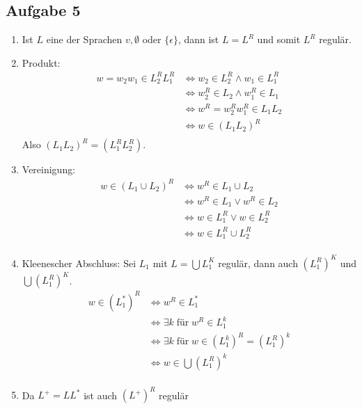 \subsection*{Aufgabe 5}
\begin{enumerate}
  \item Ist $L$ eine der Sprachen ${v}, \emptyset$ oder $\{\epsilon\}$, dann ist $L=L^R$ und somit $L^R$ regulär.
  \item Produkt:
  \begin{align*}
    w = w_2w_1 \in L_2^R L_1^R &\iff w_2 \in L_2^R \land w_1 \in L_1^R \\
    &\iff w_2^R \in L_2 \land w_1^R \in L_1 \\
    &\iff w^R = w_2^R w_1^R \in L_1 L_2 \\
    &\iff w \in (L_1 L_2)^R \\
  \end{align*}
  Also $(L_1 L_2)^R = (L_1^R L_2^R)$.

  \item Vereinigung:
  \begin{align*}
    w \in (L_1 \cup L_2)^R &\iff w^R \in L_1 \cup L_2 \\
    &\iff w^R \in L_1 \lor w^R \in L_2  \\
    &\iff w \in L_1^R \lor w \in L_2^R \\
    &\iff w \in L_1^R \cup L_2^R \\
  \end{align*}


  \item Kleenescher Abschluss:
  Sei $L_1$ mit $L=\bigcup L_1^K$ regulär, dann auch $(L_1^R)^K$ und $\bigcup (L_1^R)^K$.
  \begin{align*}
    w \in (L_1^*)^R &\iff w^R \in L_1^* \\
    &\iff \exists k \; \text{für} \; w^R \in L_1^k \\
    &\iff \exists k \; \text{für} \; w \in (L_1^k)^R = (L_1^R)^k \\
    &\iff w \in \bigcup (L_1^R)^k \\
  \end{align*}

  \item Da $L^+ = LL^*$ ist auch $(L^+)^R$ regulär

\end{enumerate}
